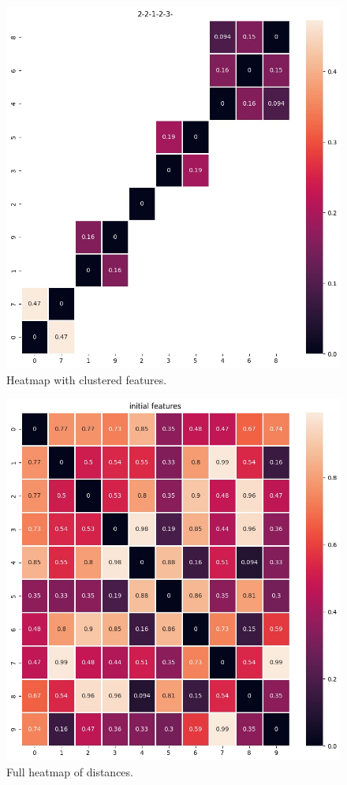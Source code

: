 \documentclass[conference]{IEEEtran}
\begin{document}
\begin{figure}[hbt!]
	\centerline{\includegraphics[scale=0.35]{picture1.jpg}}
	\caption{Heatmap with clustered features.}
	\label{fig}
\end{figure}

\begin{figure}[hbt!]
	\centerline{\includegraphics[scale=0.35]{picture2.jpg}}
	\caption{Full heatmap of distances.}
	\label{fig}
\end{figure}
\end{document}
